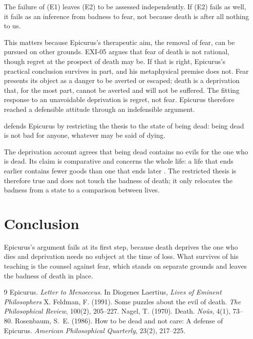 \documentclass{situationist-preprint}
\begin{document}
\begin{proposition}\label{p:stage}
The failure of (E1) leaves (E2) to be assessed independently. If (E2) fails as well, it fails as an inference from badness to fear, not because death is after all nothing to us.
\end{proposition}

This matters because Epicurus's therapeutic aim, the removal of fear, can be pursued on other grounds. EXI-05 argues that fear of death is not rational, though regret at the prospect of death may be. If that is right, Epicurus's practical conclusion survives in part, and his metaphysical premise does not. Fear presents its object as a danger to be averted or escaped; death is a deprivation that, for the most part, cannot be averted and will not be suffered. The fitting response to an unavoidable deprivation is regret, not fear. Epicurus therefore reached a defensible attitude through an indefensible argument.

\begin{objection}
\citet{Rosenbaum1986} defends Epicurus by restricting the thesis to the state of being dead: being dead is not bad for anyone, whatever may be said of dying.
\end{objection}

\begin{reply}
The deprivation account agrees that being dead contains no evils for the one who is dead. Its claim is comparative and concerns the whole life: a life that ends earlier contains fewer goods than one that ends later \citep{Feldman1991}. The restricted thesis is therefore true and does not touch the badness of death; it only relocates the badness from a state to a comparison between lives.
\end{reply}

\section{Conclusion}

Epicurus's argument fails at its first step, because death deprives the one who dies and deprivation needs no subject at the time of loss. What survives of his teaching is the counsel against fear, which stands on separate grounds and leaves the badness of death in place.

\begin{thebibliography}{9}\small
{} Epicurus. \emph{Letter to Menoeceus}. In Diogenes Laertius, \emph{Lives of Eminent Philosophers} X.
 Feldman, F. (1991). Some puzzles about the evil of death. \emph{The Philosophical Review}, 100(2), 205--227.
 Nagel, T. (1970). Death. \emph{No\^us}, 4(1), 73--80.
 Rosenbaum, S.~E. (1986). How to be dead and not care: A defense of Epicurus. \emph{American Philosophical Quarterly}, 23(2), 217--225.
\end{thebibliography}
\end{document}
